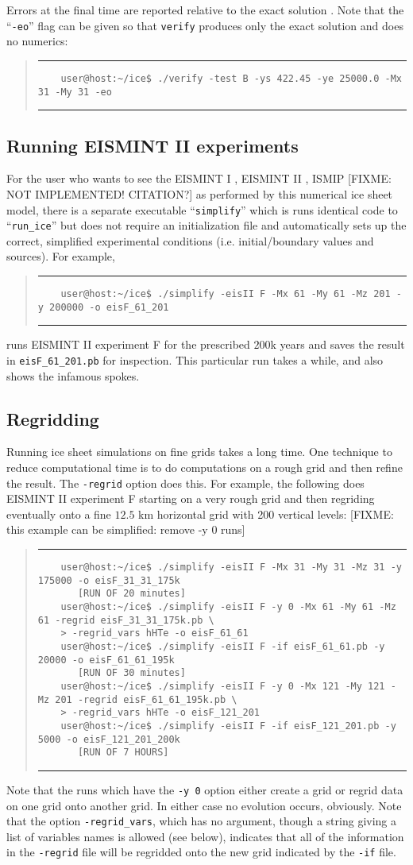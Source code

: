 \documentclass[final]{amsart}
\newcommand{\normalspacing}{\renewcommand{\baselinestretch}{1.1}\tiny\normalsize}
\renewcommand{\t}[1]{\texttt{#1}}
\newcommand{\Vend}{ \rule{4.6in}{0.1mm}\end{quote}\normalsize }
\newcommand{\beginV}{ \scriptsize\begin{quote}\rule{4.6in}{0.1mm}\begin{verbatim} }
\begin{document}
Errors at the final time are reported relative to the exact solution \cite{BLKCB}.  Note that the ``\t{-eo}'' flag can be given so that \t{verify} produces only the exact solution and does no numerics:
\beginV
    user@host:~/ice$ ./verify -test B -ys 422.45 -ye 25000.0 -Mx 31 -My 31 -eo
\end{verbatim}
\Vend

\subsection{Running EISMINT II experiments}  For the user who wants to see the EISMINT I \cite{EISMINT96}, EISMINT II \cite{EISMINT00}, ISMIP [FIXME: NOT IMPLEMENTED! CITATION?] as performed by this numerical ice sheet model, there is a separate executable ``\verb|simplify|'' which is runs identical code to ``\verb|run_ice|'' but does not require an initialization file and automatically sets up the correct, simplified experimental conditions (i.e. initial/boundary values and sources).  For example,
\beginV
    user@host:~/ice$ ./simplify -eisII F -Mx 61 -My 61 -Mz 201 -y 200000 -o eisF_61_201
\end{verbatim}
\Vend
runs EISMINT II experiment F for the prescribed $200$k years and saves the result in \verb|eisF_61_201.pb| for inspection.  This particular run takes a while, and also shows the infamous spokes.


\subsection{Regridding}  \normalspacing Running ice sheet simulations on fine grids takes a long time.  One technique to reduce computational time is to do computations on a rough grid and then refine the result.  The \verb|-regrid| option does this.  For example, the following does EISMINT II experiment F starting on a very rough grid and then regriding eventually onto a fine $12.5$ km horizontal grid with 200 vertical levels:
[FIXME: this example can be simplified: remove -y 0 runs]
\beginV
    user@host:~/ice$ ./simplify -eisII F -Mx 31 -My 31 -Mz 31 -y 175000 -o eisF_31_31_175k
       [RUN OF 20 minutes]
    user@host:~/ice$ ./simplify -eisII F -y 0 -Mx 61 -My 61 -Mz 61 -regrid eisF_31_31_175k.pb \
    > -regrid_vars hHTe -o eisF_61_61
    user@host:~/ice$ ./simplify -eisII F -if eisF_61_61.pb -y 20000 -o eisF_61_61_195k
       [RUN OF 30 minutes]
    user@host:~/ice$ ./simplify -eisII F -y 0 -Mx 121 -My 121 -Mz 201 -regrid eisF_61_61_195k.pb \
    > -regrid_vars hHTe -o eisF_121_201
    user@host:~/ice$ ./simplify -eisII F -if eisF_121_201.pb -y 5000 -o eisF_121_201_200k
       [RUN OF 7 HOURS]
\end{verbatim}
\Vend
Note that the runs which have the \verb|-y 0| option either create a grid or regrid data on one grid onto another grid.  In either case no evolution occurs, obviously.  Note that the option \verb|-regrid_vars|, which has no argument, though a string giving a list of variables names is allowed (see below), indicates that all of the information in the \verb|-regrid| file will be regridded onto the new grid indicated by the \verb|-if| file.
\end{document}
